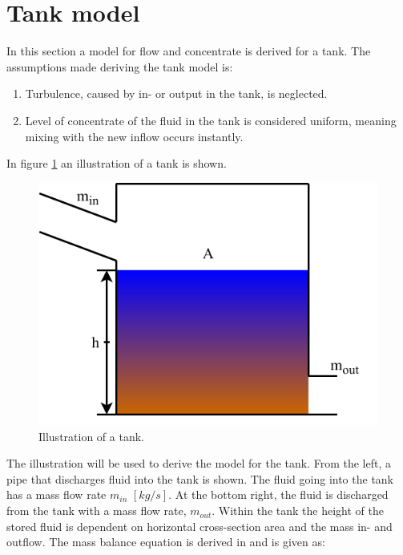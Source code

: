 \section{Tank model}\label{se:sewer_reservoir}
In this section a model for flow and concentrate is derived for a tank. %
 The assumptions made deriving the tank model is:
\begin{table}[H]
\begin{enumerate}
\item Turbulence, caused by in- or output in the tank, is neglected.
\item Level of concentrate of the fluid in the tank is considered uniform, meaning mixing with the new inflow occurs instantly. 
\end{enumerate}
\end{table}

In figure \ref{fig:tank_model} an illustration of a tank is shown.
\begin{figure}[H]
\centering
\includegraphics[width=.55\textwidth]{report/modeling/pictures/reservior.pdf}
\caption{Illustration of a tank.}
\label{fig:tank_model}
\end{figure} 

The illustration will be used to derive the model for the tank. From the left, a pipe that discharges fluid into the tank is shown. The fluid going into the tank has a mass flow rate $m_{in}$ $\left[kg/s\right]$. At the bottom right, the fluid is discharged from the tank with a mass flow rate, $m_{out}$. 
Within the tank the height of the stored fluid is dependent on horizontal cross-section area and the mass in- and outflow.
The mass balance equation is derived in \cite{model_tank} and is given as:


